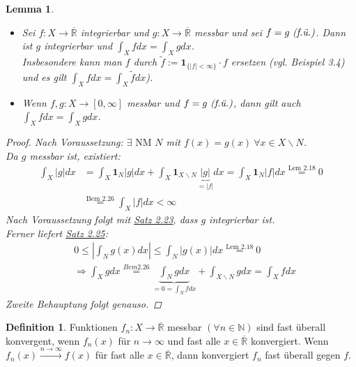 \documentclass[a4paper]{scrreprt}
\newcommand{\doubleOne}{\textbf{1}}
\newcommand{\R}{\mathbb{R}}
\newcommand{\Rq}{\overline{\R}}
\newcommand{\N}{\mathbb{N}}
\newcommand{\jlabel}[1]{\label{j_#1}}
\newcommand{\jshortlink}[1]{\jhyperref{#1}{\text{#1}}}
\newcommand{\jhyperref}[2]{\hyperref[j_#1]{#2}}
\newcommand{\jlink}[1]{\jhyperref{#1}{#1}}
\newcommand{\fu}{\text{\textit{(f.ü.)}}}
\newcommand{\jabb}[3]{ #1: #2 \rightarrow #3 }
\theoremstyle{plain}
\newtheorem{lem}[thm]{Lemma}
\theoremstyle{definition}
\newtheorem{defn}[thm]{Definition}
\begin{document}
{{{{\jlabel{Lem 3.5}
\begin{lem}
    \begin{itemize}
        \item 
            Sei $\jabb{f}{X}{\Rq}$ integrierbar und $\jabb{g}{X}{\Rq}$ messbar und sei $f=g \ \fu$. Dann ist $g$ integrierbar und $\int_X f dx = \int_X g dx$.\\
            Insbesondere kann man $f$ durch $\tilde{f} := \doubleOne_{\{|f| < \infty\}} \cdot f$ ersetzen (vgl. Beispiel 3.4) und es gilt $\int_X f dx = \int_X \tilde{f} dx$).
        \item 
            Wenn $\jabb{f,g}{X}{[0,\infty]}$ messbar und $f=g \ \fu$, dann gilt auch $\int_X f dx = \int_X g dx$.
    \end{itemize}
    \begin{proof}
        Nach Voraussetzung: $\exists \text{ NM } N$ mit $f(x) = g(x) \ \forall x\in X\backslash N$.\\
        Da $g$ messbar ist, existiert:
        \begin{displaymath}
            \begin{split}
                \int_X|g|dx &= \int_X \doubleOne_N |g| dx + \int_X \doubleOne_{X\backslash N} \underbrace{|g|}_{= |f|} dx = \int_X \doubleOne_N|f|dx \overset{\jshortlink{Lem 2.18}}{=} 0\\
                &\overset{\jshortlink{Bem 2.26}}{=} \int_X|f|dx < \infty
            \end{split}
        \end{displaymath}
        Nach Voraussetzung folgt mit \jlink{Satz 2.23}, dass $g$ integrierbar ist.\\
        Ferner liefert \jlink{Satz 2.25}:
        \begin{displaymath}
            \begin{split}
                &0 \le \left|\int_N g(x) dx\right| \le \int_N |g(x)| dx \overset{\jshortlink{Lem 2.18}}{=} 0\\
                &\Rightarrow \int_X g dx \overset{Bem 2.26}{=} \underbrace{\int_N g dx}_{ = 0= \int_N f dx} + \int_{X\backslash N} g dx = \int_X f dx
            \end{split}
        \end{displaymath}
        Zweite Behauptung folgt genauso.
    \end{proof}
\end{lem}

\begin{defn}
\jlabel{Def 3.6}
    Funktionen $\jabb{f_n}{X}{\Rq}$ messbar $(\forall n\in\N)$ sind fast überall konvergent, wenn $f_n(x)$ für $n\rightarrow \infty$ und fast alle $x\in \Rq$ konvergiert. Wenn $f_n(x) \xrightarrow{n\rightarrow \infty} f(x)$ für fast alle $x\in\Rq$, dann konvergiert $f_n$ fast überall gegen $f$.
\end{defn}

}}}}
\end{document}
